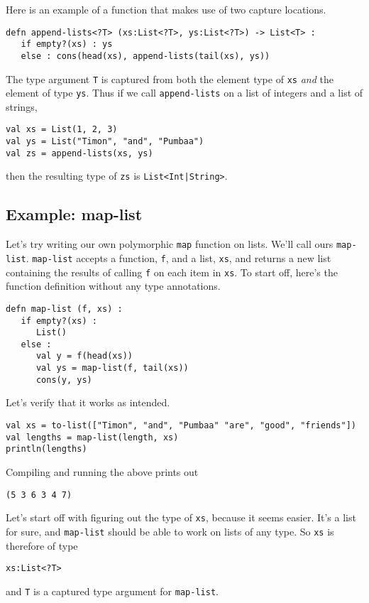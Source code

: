 \documentclass[10pt,oneside]{book}
\begin{document}
Here is an example of a function that makes use of two capture locations.
\begin{lstlisting}
defn append-lists<?T> (xs:List<?T>, ys:List<?T>) -> List<T> :
   if empty?(xs) : ys
   else : cons(head(xs), append-lists(tail(xs), ys))
\end{lstlisting}
The type argument \texttt{\frenchspacing T} is captured from both the element type of \texttt{\frenchspacing xs} {\em and} the element of type \texttt{\frenchspacing ys}. Thus if we call \texttt{\frenchspacing append-lists} on a list of integers and a list of strings,
\begin{lstlisting}
val xs = List(1, 2, 3)
val ys = List("Timon", "and", "Pumbaa")
val zs = append-lists(xs, ys)
\end{lstlisting}
then the resulting type of \texttt{\frenchspacing zs} is \texttt{\frenchspacing List<Int|String>}. 

\subsection*{Example: map-list}
Let's try writing our own polymorphic \texttt{\frenchspacing map} function on lists. We'll call ours \texttt{\frenchspacing map-list}. \texttt{\frenchspacing map-list} accepts a function, \texttt{\frenchspacing f}, and a list, \texttt{\frenchspacing xs}, and returns a new list containing the results of calling \texttt{\frenchspacing f} on each item in \texttt{\frenchspacing xs}. To start off, here's the function definition without any type annotations.
\begin{lstlisting}
defn map-list (f, xs) :
   if empty?(xs) :
      List()
   else :
      val y = f(head(xs))
      val ys = map-list(f, tail(xs))
      cons(y, ys)
\end{lstlisting}
Let's verify that it works as intended.
\begin{lstlisting}
val xs = to-list(["Timon", "and", "Pumbaa" "are", "good", "friends"])
val lengths = map-list(length, xs)
println(lengths)
\end{lstlisting}
Compiling and running the above prints out
\begin{lstlisting}
(5 3 6 3 4 7)
\end{lstlisting}

Let's start off with figuring out the type of \texttt{\frenchspacing xs}, because it seems easier. It's a list for sure, and \texttt{\frenchspacing map-list} should be able to work on lists of any type. So \texttt{\frenchspacing xs} is therefore of type
\begin{lstlisting}
xs:List<?T>
\end{lstlisting}
and \texttt{\frenchspacing T} is a captured type argument for \texttt{\frenchspacing map-list}. 
\end{document}
